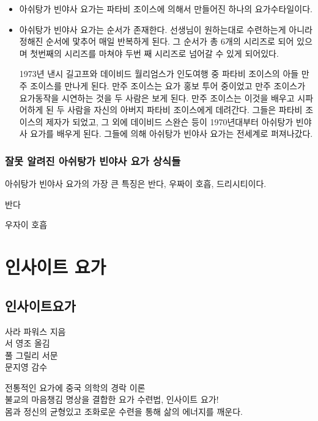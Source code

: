 \documentclass[12pt, a4paper, oneside]{book}
\let\stdsection\section
\renewcommand\section{\newpage\stdsection}
\begin{document}
		\begin{itemize}
			\item 	아쉬탕가 빈야사 요가는 파타비 조이스에 의해서 만들어진 하나의 요가수타일이다.

			\item 	아쉬탕가 빈야사 요가는 순서가 존재한다.
선생님이 원하는대로 수련하는게 아니라 정해진 순서에 맟추어 매일 반복하게 된다.
그 순서가 총 6개의 시리즈로 되어 있으며 첫번째의 시리즈를 마쳐야 두번 째 시리즈로 넘어갈 수 있게 되어있다.

1973년 낸시 길고프와 데이비드 월리엄스가 인도여행 중 파타비 조이스의 아들 만주 조이스를 만나게 된다.
만주 조이스는 요가 홍보 투어 중이었고 만주 조이스가 요가동작을 시연하는 것을 두 사람은 보게 된다.
만주 조이스는 이것을 배우고 시파어하게 된 두 사람을 자신의 아버지 파타비 조이스에게 데려간다.
그들은 파타비 조이스의 제자가 되었고, 그 외에 데이비드 스완슨 등이 1970년대부터 아쉬탕가 빈야사 요가를 배우게 된다.
그들에 의해 아쉬탕가 빈야사 요가는 전세계로 퍼져나갔다.

		\end{itemize}


	\subsection{잘못 알려진 아쉬탕가 빈야사 요가 상식들}

아쉬탕가 빈야사 요가의 가장 큰 특징은 반다, 우짜이 호흡, 드리시티이다.

반다

우자이 호흡


	\chapter{인사이트 요가}
	\minitoc

%
	\section{인사이트요가}

	사라 파워스 지음\\
	서 영조 올김\\
	풀 그릴리 서문\\
	문지영 감수\\

		\begin{flushright}
		전통적인 요가에 중국 의학의 경락 이론\\
		불교의 마음챙김 명상을 결합한 요가 수련법, 인사이트 요가! \\
		몸과 정신의 균형있고 조화로운 수련을 통해 삶의 에너지를 깨운다.
		\end{flushright}
\end{document}
